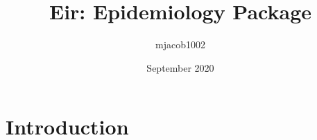 \documentclass{article}
\title{Eir: Epidemiology Package}
\author{mjacob1002 }
\date{September 2020}
\begin{document}
\maketitle

\section{Introduction}
\end{document}
